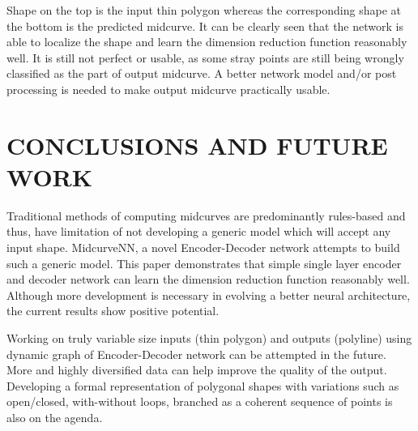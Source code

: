 \documentclass[9pt,academicons]{article}
\begin{document}
Shape on the top is the input thin polygon whereas the corresponding shape at the bottom is the predicted midcurve. It can be clearly seen that the network is able to localize the shape and learn the dimension reduction function reasonably well. It is still not perfect or usable, as some stray points are still being wrongly classified as the part of output midcurve. A better network model and/or post processing is needed to make output midcurve practically usable.


\section{CONCLUSIONS AND FUTURE WORK}

Traditional methods of computing midcurves are predominantly rules-based and thus, have limitation of not developing a generic model which will accept any input shape. MidcurveNN, a novel Encoder-Decoder network attempts to build such a generic model. This paper demonstrates that simple single layer encoder and decoder network can learn the dimension reduction function reasonably well. Although more development is necessary in evolving a better neural architecture, the current results show positive potential. 

Working on truly variable size inputs (thin polygon) and outputs (polyline) using dynamic graph of Encoder-Decoder network can be attempted in the future. More and highly diversified data can help improve the quality of the output. Developing a formal representation of polygonal shapes with variations such as open/closed, with-without loops, branched as a coherent sequence of points is also on the agenda.

\bigskip
 








\bigskip
\end{document}
